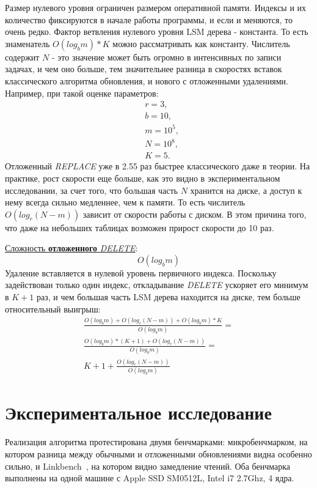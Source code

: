 \documentclass[a4paper,hidelinks,12pt]{article}
\begin{document}
Размер нулевого уровня ограничен размером оперативной памяти. Индексы и их
количество фиксируются в начале работы программы, и если и меняются, то очень
редко. Фактор ветвления нулевого уровня LSM дерева - константа. То есть
знаменатель $O(log_bm) * K$ можно рассматривать как константу. Числитель
содержит $N$ - это значение может быть огромно в интенсивных по записи задачах,
и чем оно больше, тем значительнее разница в скоростях вставок классического
алгоритма обновления, и нового с отложенными удалениями. Например, при такой
оценке параметров:
\begin{align*}
&r = 3, \\
&b = 10, \\
&m = 10^5, \\
&N = 10^8, \\
&K = 5.
\end{align*}
Отложенный \textit{REPLACE} уже в 2.55 раз быстрее классического даже в теории.
На практике, рост скорости еще больше, как это видно в экспериментальном
исследовании, за счет того, что большая часть $N$ хранится на диске, а доступ к
нему всегда сильно медленнее, чем к памяти. То есть числитель $O(log_r(N - m))$
зависит от скорости работы с диском. В этом причина того, что даже на небольших
таблицах возможен прирост скорости до 10 раз.

\underline{Сложность \textbf {отложенного} \textit{DELETE}}:
\begin{displaymath}
O(log_bm)
\end{displaymath}
Удаление вставляется в нулевой уровень первичного индекса. Поскольку
задействован только один индекс, откладывание \textit{DELETE} ускоряет его
минимум в $K + 1$ раз, и чем большая часть LSM дерева находится на диске, тем
больше относительный выигрыш:
\begin{gather*}
\frac{O(log_bm) + O(log_r(N-m)) + O(log_bm) * K}{O(log_bm)} = \\
\frac{O(log_bm)*(K + 1) + O(log_r(N-m))}{O(log_bm)} = \\
K + 1 + \frac{O(log_r(N-m))}{O(log_bm)}
\end{gather*}

\section{Экспериментальное исследование}
Реализация алгоритма протестирована двумя бенчмарками: микробенчмарком, на
котором разница между обычными и отложенными обновлениями видна особенно сильно,
и Linkbench~\cite{linkbench}, на котором видно замедление чтений. Оба бенчмарка
выполнены на одной машине с Apple SSD SM0512L, Intel i7 2.7Ghz, 4 ядра.
\end{document}
